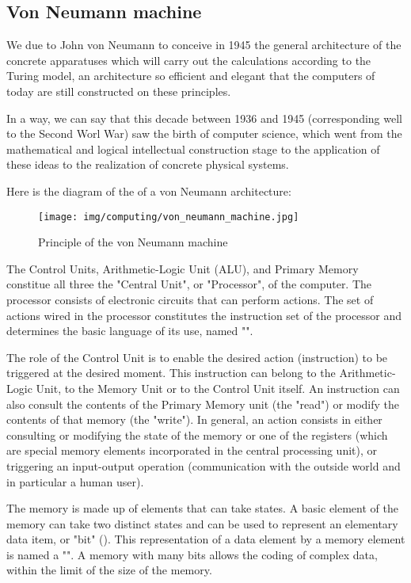 	\subsection{Von Neumann machine}
	We due to John von Neumann to conceive in 1945 the general architecture of the concrete apparatuses which will carry out the calculations according to the Turing model, an architecture so efficient and elegant that the computers of today are still constructed on these principles.
	
	\begin{tcolorbox}[title=Remark,colframe=black,arc=10pt]
	In a way, we can say that this decade between 1936 and 1945 (corresponding well to the Second Worl War) saw the birth of computer science, which went from the mathematical and logical intellectual construction stage to the application of these ideas to the realization of concrete physical systems.
	\end{tcolorbox}
	Here is the diagram of the of a von Neumann architecture:
	\begin{figure}[H]
		\centering
		\texttt{[image: img/computing/von\_neumann\_machine.jpg]}
		\caption{Principle of the von Neumann machine}
	\end{figure}
	The Control Units, Arithmetic-Logic Unit (ALU), and Primary Memory constitue all three the "Central Unit", or "Processor", of the computer. The processor consists of electronic circuits that can perform actions. The set of actions wired in the processor constitutes the instruction set of the processor and determines the basic language of its use, named "".

	The role of the Control Unit is to enable the desired action (instruction) to be triggered at the desired moment. This instruction can belong to the Arithmetic-Logic Unit, to the Memory Unit or to the Control Unit itself. An instruction can also consult the contents of the Primary Memory unit (the "read") or modify the contents of that memory (the "write"). In general, an action consists in either consulting or modifying the state of the memory or one of the registers (which are special memory elements incorporated in the central processing unit), or triggering an input-output operation (communication with the outside world and in particular a human user).
	
	The memory is made up of elements that can take states. A basic element of the memory can take two distinct states and can be used to represent an elementary data item, or "bit" (). This representation of a data element by a memory element is named a "". A memory with many bits allows the coding of complex data, within the limit of the size of the memory.

